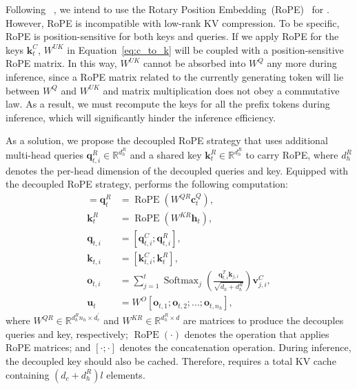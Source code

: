 Following \dsvi{}~\citep{deepseek1}, we intend to use the Rotary Position Embedding~(RoPE)~\citep{su2024roformer} for \dsvii{}. 
However, RoPE is incompatible with low-rank KV compression. 
To be specific, RoPE is position-sensitive for both keys and queries. 
If we apply RoPE for the keys $\mathbf{k}_{t}^{C}$, $W^{UK}$ in Equation~\ref{eq:c_to_k} will be coupled with a position-sensitive RoPE matrix. 
In this way, $W^{UK}$ cannot be absorbed into $W^{Q}$ any more during inference, since a RoPE matrix related to the currently generating token will lie between $W^{Q}$ and $W^{UK}$ and matrix multiplication does not obey a commutative law. 
As a result, we must recompute the keys for all the prefix tokens during inference, which will significantly hinder the inference efficiency. 

As a solution, we propose the decoupled RoPE strategy that uses additional multi-head queries $\mathbf{q}_{t, i}^{R} \in \mathbb{R}^{d_h^R}$ and a shared key $\mathbf{k}_{t}^{R} \in \mathbb{R}^{d_h^R}$ to carry RoPE, where $d_h^R$ denotes the per-head dimension of the decoupled queries and key. 
Equipped with the decoupled RoPE strategy, \dsattn{} performs the following computation:
\begin{align}
    [\mathbf{q}_{t, 1}^{R};\mathbf{q}_{t, 2}^{R};...;\mathbf{q}_{t, n_{h}}^{R}] = \mathbf{q}_{t}^{R} &= \operatorname{RoPE}({W^{QR}} \mathbf{c}_{t}^{Q}), \\
    \mathbf{k}_{t}^{R} &= \operatorname{RoPE}({W^{KR}} \mathbf{h}_{t}), \\
    \mathbf{q}_{t, i} &= [\mathbf{q}_{t, i}^{C}; \mathbf{q}_{t, i}^{R}], \\
    \mathbf{k}_{t, i} &= [\mathbf{k}_{t, i}^{C}; \mathbf{k}_{t}^{R}], \\
    \mathbf{o}_{t, i} &= \sum_{j=1}^{t} \operatorname{Softmax}_j(\frac{\mathbf{q}_{t, i}^T \mathbf{k}_{j, i}}{\sqrt{d_{h} + d_{h}^{R}}}) \mathbf{v}_{j, i}^{C}, \\ 
    \mathbf{u}_{t} &= W^{O} [\mathbf{o}_{t, 1};\mathbf{o}_{t, 2};...;\mathbf{o}_{t, n_{h}}],
\end{align}
where $W^{QR} \in \mathbb{R}^{d_h^R n_h \times d_c^{\prime}}$ and $W^{KR} \in \mathbb{R}^{d_h^R \times d}$ are matrices to produce the decouples queries and key, respectively; 
$\operatorname{RoPE}(\cdot)$ denotes the operation that applies RoPE matrices; 
and $[\cdot;\cdot]$ denotes the concatenation operation. 
During inference, the decoupled key should also be cached. 
Therefore, \dsvii{} requires a total KV cache containing $(d_{c} + d_h^R)l$ elements. 

